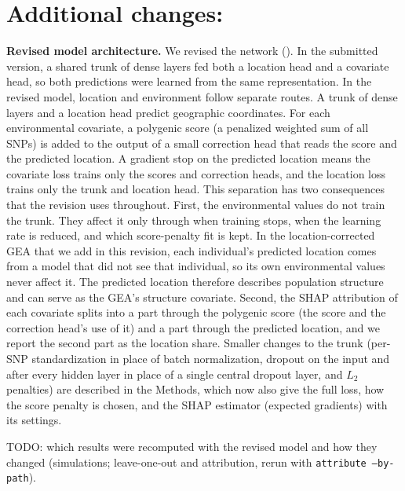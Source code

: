 
\section*{Additional changes:}
\label{sec:additional}

\noindent
\textbf{Revised model architecture.}
We revised the \ecolocator network  ().
In the submitted version, a shared trunk of dense layers fed both a location head
and a covariate head, so both predictions were learned from the same representation.
In the revised model, location and environment follow separate routes.
A trunk of dense layers and a location head predict geographic coordinates.
For each environmental covariate, a polygenic score (a penalized weighted sum of all SNPs)
is added to the output of a small correction head that reads the score and the predicted location.
A gradient stop on the predicted location means the covariate loss trains
only the scores and correction heads, and the location loss trains only the trunk
and location head.
This separation has two consequences that the revision uses throughout.
First, the environmental values do not train the trunk.
They affect it only through when training stops, when the learning rate is reduced,
and which score-penalty fit is kept.
In the location-corrected GEA that we add in this revision,
each individual's predicted location comes from a model that did not see that individual,
so its own environmental values never affect it.
The predicted location therefore describes population structure
and can serve as the GEA's structure covariate.
Second, the SHAP attribution of each covariate splits into a part through the
polygenic score (the score and the correction head's use of it)
and a part through the predicted location,
and we report the second part as the location share.
Smaller changes to the trunk (per-SNP standardization in place of batch normalization,
dropout on the input and after every hidden layer in place of a single central dropout layer,
and $L_2$ penalties) are described in the Methods,
which now also give the full loss, how the score penalty is chosen,
and the SHAP estimator (expected gradients) with its settings.

TODO: which results were recomputed with the revised model and how they changed
(simulations; \dfir{} leave-one-out and attribution, rerun with \texttt{attribute --by-path}).

